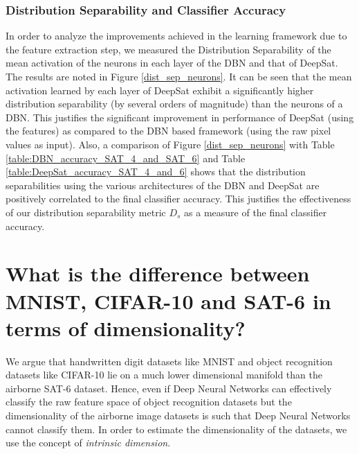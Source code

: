 \documentclass[11pt,a4paper]{article}
\begin{document}
\subsubsection{Distribution Separability and Classifier Accuracy}
In order to analyze the improvements achieved in the learning framework due to the feature extraction step, we measured the Distribution Separability of the mean activation of the neurons in each layer of the DBN and that of DeepSat. The results are noted in Figure \ref{dist_sep_neurons}. It can be seen that the mean activation learned by each layer of DeepSat exhibit a significantly higher distribution separability (by several orders of magnitude) than the neurons of a DBN. This justifies the significant improvement in performance of DeepSat (using the features) as compared to the DBN based framework (using the raw pixel values as input). Also, a comparison of Figure \ref{dist_sep_neurons} with Table \ref{table:DBN_accuracy_SAT_4_and_SAT_6} and Table \ref{table:DeepSat_accuracy_SAT_4_and_6} shows that the distribution separabilities using the various architectures of the DBN and DeepSat are positively correlated to the final classifier accuracy. This justifies the effectiveness of our distribution separability metric $D_s$ as a measure of the final classifier accuracy.

\begin{figure*}
\centering
{}
\caption{Distribution Separability Criterion of the neurons in the layers of a DBN and DeepSat with various architectures on SAT-6}
\label{dist_sep_neurons}
\end{figure*}

\section{What is the difference between MNIST, CIFAR-10 and SAT-6 in terms of dimensionality?}  
We argue that handwritten digit datasets like MNIST and object recognition datasets like CIFAR-10 lie on a much lower dimensional manifold than the airborne SAT-6 dataset. Hence, even if Deep Neural Networks can effectively classify the raw feature space of object recognition datasets but the dimensionality of the airborne image datasets is such that Deep Neural Networks cannot classify them. In order to estimate the dimensionality of the datasets, we use the concept of \emph{intrinsic dimension}\cite{Ceruti20142569}.   
\end{document}
